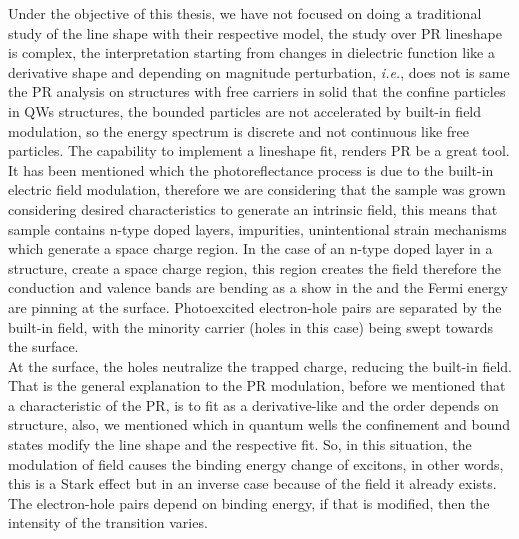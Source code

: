 Under the objective of this thesis, we have not focused on doing a traditional study of the line shape with their respective model, the study over \gls{PR} lineshape is complex, the interpretation starting from changes in dielectric function like a derivative shape and depending on magnitude perturbation, \textit{i.e.}, does not is same the  PR analysis on structures with free carriers in solid that the confine particles in QWs structures, the bounded particles are not accelerated by built-in field modulation, so the energy spectrum is discrete and not continuous like free particles.  The capability to implement a lineshape fit,  renders PR be a great tool. 
It has been mentioned which the photoreflectance process is due to the built-in electric field modulation, therefore we are considering that the sample was grown considering desired characteristics to generate an intrinsic field, this means that sample contains n-type doped layers, impurities, unintentional strain mechanisms which generate a space charge region. In the case of an n-type doped layer in a structure, create a space charge region, this region creates the field therefore the conduction and valence bands are bending as a show in the  and the Fermi energy are pinning at the surface. Photoexcited electron-hole pairs are separated by the built-in field, with the
minority carrier (holes in this case) being swept towards the surface.\\
At the surface, the holes neutralize the trapped charge, reducing the built-in field\cite{misiewicz1999photoreflectance}. That is the general explanation to the PR modulation, before we mentioned that a characteristic of the PR, is to fit as a derivative-like and the order depends on structure, also, we mentioned which in quantum wells the confinement and bound states modify the line shape and the respective fit. So, in this situation, the modulation of field causes the binding energy change of excitons, in other words, this is a Stark effect but in an inverse case because of the field it already exists. The electron-hole pairs depend on binding energy,  if that is modified, then the intensity of the transition varies.  

